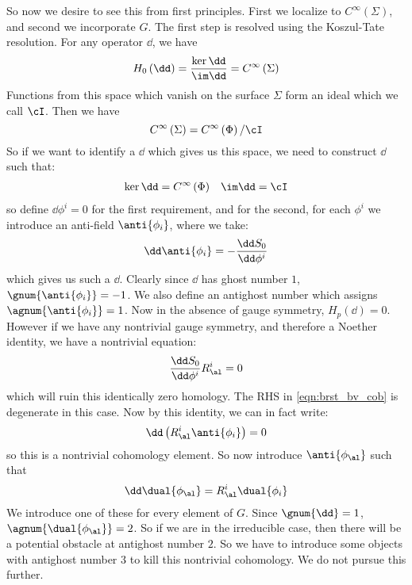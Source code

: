 \documentclass{booc}
\begin{document}
So now we desire to see this from first principles.
First we localize to $C^\infty\left( \Sigma \right)$, 
and second we incorporate $G$.
The first step is resolved using the Koszul-Tate resolution.
For any operator $\dd$, we have
\begin{equation}
H_0\left( \dd \right) = \frac{\ker \dd}{\im \dd} = C^\infty\left( \Sigma \right)
\end{equation}
Functions from this space which vanish on the surface $\Sigma$
form an ideal which we call $\cI$. 
Then we have
\begin{equation}
C^\infty\left( \Sigma \right) = C^\infty\left( \Phi \right) / \cI
\end{equation}
So if we want to identify a $\dd$ which gives us this space, 
we need to construct $\dd$ such that:
\begin{align}
\ker \dd = C^\infty\left( \Phi \right)
&&
\im \dd = \cI
\end{align}
so define $\dd \phi^i = 0$ for the first requirement, 
and for the second, for each $\phi^i$ we introduce
an anti-field $\anti{\phi_i}$, where we take:
\begin{equation}
\dd\anti{\phi_i} = - \frac{\dd S_0}{\dd \phi^i}
\label{eqn:brst_bv_cob}
\end{equation}
which gives us such a $\dd$.
Clearly since $\dd$ has ghost number $1$, $\gnum{\anti{\phi_i}} = -1$. 
We also define an antighost number which assigns $\agnum{\anti{\phi_i}} = 1$.
Now in the absence of gauge symmetry, $H_p\left( \dd \right) = 0$.
However if we have any nontrivial gauge symmetry, and therefore a Noether identity, 
we have a nontrivial equation:
\begin{equation}
\frac{\dd S_0}{\dd\phi^i} R^i_\al = 0
\end{equation}
which will ruin this identically zero homology. The RHS in \eqref{eqn:brst_bv_cob} 
is degenerate in this case. Now by this identity, we can in fact write:
\begin{equation}
\dd\left( R^i_\al \anti{\phi_i} \right) = 0
\end{equation}
so this is a nontrivial cohomology element.
So now introduce $\anti{\phi_\al}$ such that
\begin{equation}
\dd \dual{\phi_\al} = R^i_\al \dual{\phi_i}
\end{equation}
We introduce one of these for every element of $G$. 
Since $\gnum{\dd} = 1$, $\agnum{\dual{\phi_\al}} = 2$.
So if we are in the irreducible case, then there will be a potential obstacle at
antighost number $2$. 
So we have to introduce some objects with antighost number $3$ to kill this nontrivial cohomology.
We do not pursue this further.
\end{document}
